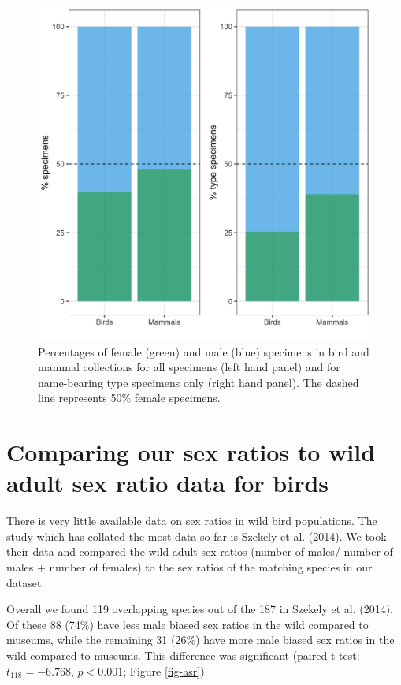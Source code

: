 \documentclass[a4paper, 12pt]{article}
\begin{document}
\begin{figure}[H]
 \centering
  \includegraphics[width = \linewidth]{figures/types-all.png}
  \caption{Percentages of female (green) and male (blue) specimens in bird and mammal collections for all specimens (left hand panel) and for name-bearing type specimens only (right hand panel). 
  The dashed line represents 50\% female specimens.}
  \label{fig-types}
\end{figure}

\newpage


\newpage
\section{Comparing our sex ratios to wild adult sex ratio data for birds}

There is very little available data on sex ratios in wild bird populations. The study which has collated the most data so far is Szekely et al. (2014). We took their data and compared the wild adult sex ratios (number of males/ number of males + number of females) to the sex ratios of the matching species in our dataset.

Overall we found 119 overlapping species out of the 187 in Szekely et al. (2014)\cite{szekely2014sex}.
Of these 88 (74\%) have less male biased sex ratios in the wild compared to museums, while the remaining 31 (26\%) have more male biased sex ratios in the wild compared to museums. 
This difference was significant (paired t-test: $t_{118} = -6.768$, $p < 0.001$; Figure \ref{fig-asr})
\end{document}
